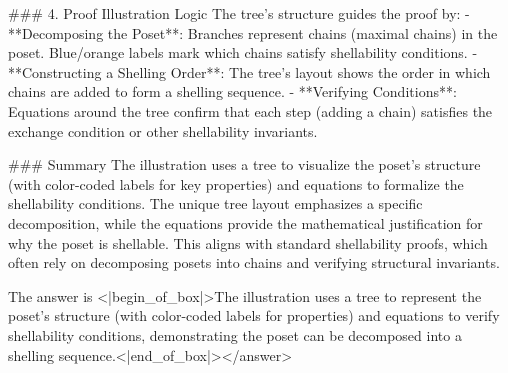 ### 4. Proof Illustration Logic  
The tree’s structure guides the proof by:  
- **Decomposing the Poset**: Branches represent chains (maximal chains) in the poset. Blue/orange labels mark which chains satisfy shellability conditions.  
- **Constructing a Shelling Order**: The tree’s layout shows the order in which chains are added to form a shelling sequence.  
- **Verifying Conditions**: Equations around the tree confirm that each step (adding a chain) satisfies the exchange condition or other shellability invariants.  


### Summary  
The illustration uses a tree to visualize the poset’s structure (with color-coded labels for key properties) and equations to formalize the shellability conditions. The unique tree layout emphasizes a specific decomposition, while the equations provide the mathematical justification for why the poset is shellable. This aligns with standard shellability proofs, which often rely on decomposing posets into chains and verifying structural invariants.  

The answer is <|begin_of_box|>The illustration uses a tree to represent the poset’s structure (with color-coded labels for properties) and equations to verify shellability conditions, demonstrating the poset can be decomposed into a shelling sequence.<|end_of_box|></answer>
